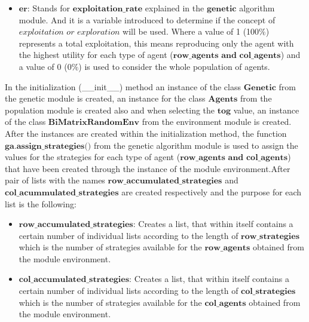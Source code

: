 \documentclass{book}
\begin{document}
\begin{itemize}
	\item $\textbf{er:}$ Stands for $\textbf{exploitation\_rate}$ explained in the $\textbf{genetic}$ algorithm module. And it is a variable introduced to determine if the concept of $\textit{exploitation or exploration}$ will be used. Where a value of 1 (100$\%$) represents a total exploitation, this means reproducing only the agent with the highest utility for each type of agent ($\textbf{row\_agents and col\_agents}$) and a value of 0 (0$\%$) is used to consider the whole population of agents.
\end{itemize}

In the initialization (\_\_init\_\_) method an instance of the class $\textbf{Genetic}$ from the genetic module is created, an instance for the class $\textbf{Agents}$ from the population module is created also and when selecting the $\textbf{tog}$ value, an instance of the class $\textbf{BiMatrixRandomEnv}$ from the environment module is created. After the instances are created within the initialization method, the function $\textbf{ga.assign\_strategies()}$ from the genetic algorithm module is used to assign the values for the strategies for each type of agent ($\textbf{row\_agents and col\_agents}$) that have been created through the instance of the module environment.After pair of lists with the names $\textbf{row\_accumulated\_strategies}$ and $\textbf{col\_acummulated\_strategies}$ are created respectively and the purpose for each list is the following:

\begin{itemize}
	\item$\textbf{row\_accumulated\_strategies}$: Creates a list, that within itself contains a certain number of individual lists according to the length of $\textbf{row\_strategies}$ which is the number of strategies available for the $\textbf{row\_agents}$ obtained from the module environment.
	\item$\textbf{col\_accumulated\_strategies}$: Creates a list, that within itself contains a certain number of individual lists according to the length of $\textbf{col\_strategies}$ which is the number of strategies available for the $\textbf{col\_agents}$ obtained from the module environment.

\end{itemize}
\end{document}
